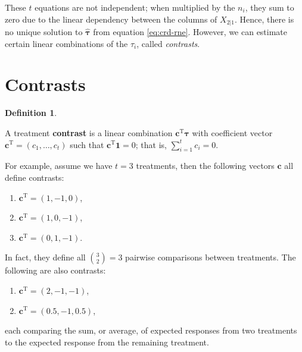 \documentclass[
]{book}
\providecommand{\tightlist}{%
  \setlength{\itemsep}{0pt}\setlength{\parskip}{0pt}}
\theoremstyle{definition}
\newtheorem{definition}{Definition}[chapter]
\theoremstyle{definition}
\theoremstyle{definition}
\theoremstyle{definition}
\theoremstyle{remark}
\begin{document}
These \(t\) equations are not independent; when multiplied by the \(n_i\), they sum to zero due to the linear dependency between the columns of \(X_{2|1}\). Hence, there is no unique solution to \(\hat{\boldsymbol{\tau}}\) from equation \eqref{eq:crd-rne}. However, we can estimate certain linear combinations of the \(\tau_i\), called \emph{contrasts}.

\hypertarget{contrasts}{%
\section{Contrasts}\label{contrasts}}

\begin{definition}
\protect\hypertarget{def:contrast}{}\label{def:contrast}

A treatment \textbf{contrast} is a linear combination \(\boldsymbol{c}^{\mathrm{T}}\boldsymbol{\tau}\) with coefficient vector \(\boldsymbol{c}^{\mathrm{T}} = (c_1,\ldots, c_t)\) such that \(\boldsymbol{c}^{\mathrm{T}}\boldsymbol{1} = 0\); that is, \(\sum_{i = 1}^t c_i = 0\).

\end{definition}

For example, assume we have \(t = 3\) treatments, then the following vectors \(\boldsymbol{c}\) all define contrasts:

\begin{enumerate}
\def\labelenumi{\arabic{enumi}.}
\tightlist
\item
  \(\boldsymbol{c}^{\mathrm{T}} = (1, -1, 0)\),
\item
  \(\boldsymbol{c}^{\mathrm{T}} = (1, 0, -1)\),
\item
  \(\boldsymbol{c}^{\mathrm{T}} = (0, 1, -1)\).
\end{enumerate}

In fact, they define all \({3\choose 2} = 3\) pairwise comparisons between treatments. The following are also contrasts:

\begin{enumerate}
\def\labelenumi{\arabic{enumi}.}
\setcounter{enumi}{3}
\tightlist
\item
  \(\boldsymbol{c}^{\mathrm{T}} = (2, -1, -1)\),
\item
  \(\boldsymbol{c}^{\mathrm{T}} = (0.5, -1, 0.5)\),
\end{enumerate}

each comparing the sum, or average, of expected responses from two treatments to the expected response from the remaining treatment.
\end{document}
